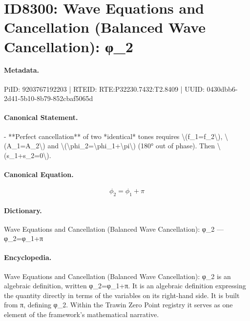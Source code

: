\section*{ID8300: Wave Equations and Cancellation (Balanced Wave Cancellation): φ\_2}
\paragraph{Metadata.}
PiID: 9203767192203 | RTEID: RTE:P32230.7432:T2.8409 | UUID: 0430dbb6-2d41-5b10-8b79-852cbaf5065d

\paragraph{Canonical Statement.}
- **Perfect cancellation** of two *identical* tones requires \textbackslash{}(f\_1=f\_2\textbackslash{}), \textbackslash{}(A\_1=A\_2\textbackslash{}) and \textbackslash{}(\textbackslash{}phi\_2=\textbackslash{}phi\_1+\textbackslash{}pi\textbackslash{}) (180° out of phase). Then \textbackslash{}(s\_1+s\_2=0\textbackslash{}).

\paragraph{Canonical Equation.}
\[
\phi_2=\phi_1+\pi
\]

\paragraph{Dictionary.}
Wave Equations and Cancellation (Balanced Wave Cancellation): φ\_2 — φ\_2=φ\_1+π

\paragraph{Encyclopedia.}
Wave Equations and Cancellation (Balanced Wave Cancellation): φ\_2 is an algebraic definition, written φ\_2=φ\_1+π. It is an algebraic definition expressing the quantity directly in terms of the variables on its right-hand side. It is built from π, defining φ\_2. Within the Trawin Zero Point registry it serves as one element of the framework's mathematical narrative.
